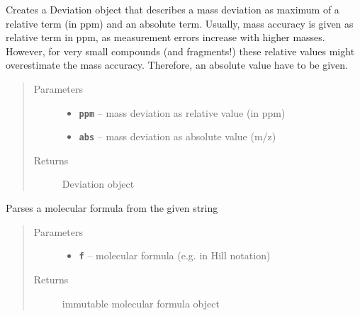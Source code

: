 \documentclass[letterpaper,10pt,openany,oneside]{sphinxmanual}
\begin{document}

\begin{fulllineitems}
\label{library:de.unijena.bioinf.sirius.getMassDeviation(int, double)}
Creates a Deviation object that describes a mass deviation as maximum of a relative term (in ppm) and an absolute term. Usually, mass accuracy is given as relative term in ppm, as measurement errors increase with higher masses. However, for very small compounds (and fragments!) these relative values might overestimate the mass accuracy. Therefore, an absolute value have to be given.
\begin{quote}\begin{description}
\item[{Parameters}] \leavevmode\begin{itemize}
\item {} 
\textbf{\texttt{ppm}} -- mass deviation as relative value (in ppm)

\item {} 
\textbf{\texttt{abs}} -- mass deviation as absolute value (m/z)

\end{itemize}

\item[{Returns}] \leavevmode
Deviation object

\end{description}\end{quote}

\end{fulllineitems}


\begin{fulllineitems}
\label{library:de.unijena.bioinf.sirius.parseFormula(String)}
Parses a molecular formula from the given string
\begin{quote}\begin{description}
\item[{Parameters}] \leavevmode\begin{itemize}
\item {} 
\textbf{\texttt{f}} -- molecular formula (e.g. in Hill notation)

\end{itemize}

\item[{Returns}] \leavevmode
immutable molecular formula object

\end{description}\end{quote}

\end{fulllineitems}
\end{document}
